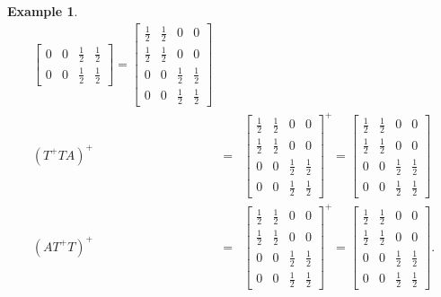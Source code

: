 \documentclass[aos]{imsart}
\newtheorem{Example}{Example}
\numberwithin{equation}{section}
\begin{document}
\begin{Example}
\begin{eqnarray*}
\begin{bmatrix}
                  0 & 0 & \frac{1}{2} & \frac{1}{2}\\
                  0 & 0 & \frac{1}{2} & \frac{1}{2}
                  \end{bmatrix}=\begin{bmatrix}
                  \frac{1}{2} & \frac{1}{2} & 0 & 0\\
                  \frac{1}{2} & \frac{1}{2} & 0 & 0\\
                  0 & 0 & \frac{1}{2} & \frac{1}{2}\\
                  0 & 0 & \frac{1}{2} & \frac{1}{2}
                  \end{bmatrix}\\%
    (T^{+}TA)^{+}&=&\begin{bmatrix}
                  \frac{1}{2} & \frac{1}{2} & 0 & 0\\
                  \frac{1}{2} & \frac{1}{2} & 0 & 0\\
                  0 & 0 & \frac{1}{2} & \frac{1}{2}\\
                  0 & 0 & \frac{1}{2} & \frac{1}{2}
                  \end{bmatrix}^{+}=\begin{bmatrix}
                  \frac{1}{2} & \frac{1}{2} & 0 & 0\\
                  \frac{1}{2} & \frac{1}{2} & 0 & 0\\
                  0 & 0 & \frac{1}{2} & \frac{1}{2}\\
                  0 & 0 & \frac{1}{2} & \frac{1}{2}
                  \end{bmatrix}\\%
    (AT^{+}T)^{+}&=&\begin{bmatrix}
                  \frac{1}{2} & \frac{1}{2} & 0 & 0\\
                  \frac{1}{2} & \frac{1}{2} & 0 & 0\\
                  0 & 0 & \frac{1}{2} & \frac{1}{2}\\
                  0 & 0 & \frac{1}{2} & \frac{1}{2}
                  \end{bmatrix}^{+}=\begin{bmatrix}
                  \frac{1}{2} & \frac{1}{2} & 0 & 0\\
                  \frac{1}{2} & \frac{1}{2} & 0 & 0\\
                  0 & 0 & \frac{1}{2} & \frac{1}{2}\\
                  0 & 0 & \frac{1}{2} & \frac{1}{2}
                  \end{bmatrix}.%
\end{eqnarray*}


\end{Example}
\end{document}
